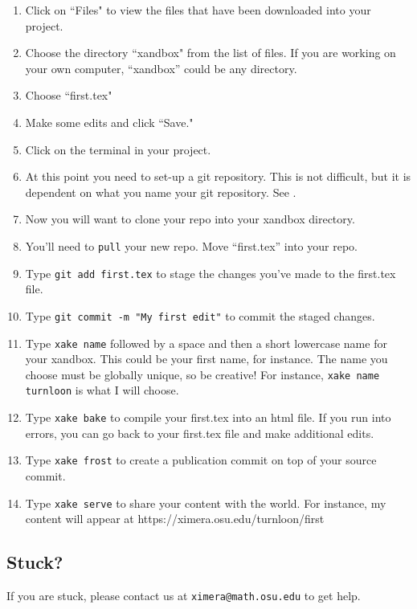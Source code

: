 \documentclass{ximera}
\begin{document}
\begin{enumerate}

\item Click on ``Files" to view the files that have been downloaded into your project.
\item Choose the directory ``xandbox" from the list of files. If you are working on your own computer, ``xandbox'' could be any directory.
\item Choose ``first.tex"
\item Make some edits and click ``Save."
\item Click on the terminal in your project.
\item At this point you need to set-up a git repository. This is not difficult, but it is dependent on what you name your git repository. See .
\item Now you will want to clone your repo into your xandbox directory.
\item You'll need to \verb!pull! your new repo. Move ``first.tex'' into your repo. 
\item Type \verb!git add first.tex! to stage the changes you've made to the first.tex file.
\item Type \verb!git commit -m "My first edit"! to commit the staged changes.
\item Type \verb!xake name! followed by a space and then a short lowercase name for your xandbox.  This could be your first name, for instance.  The name you choose must be globally unique, so be creative!  For instance, \verb!xake name turnloon! is what I will choose.
\item Type \verb!xake bake! to compile your first.tex into an html file.  If you run into errors, you can go back to your first.tex file and make additional edits.
\item Type \verb!xake frost! to create a publication commit on top of your source commit.
\item Type \verb!xake serve! to share your content with the world.  For instance, my content will appear at https://ximera.osu.edu/turnloon/first
\end{enumerate}

\subsection{Stuck?}

If you are stuck, please contact us at \texttt{ximera@math.osu.edu} to get help.
\end{document}
